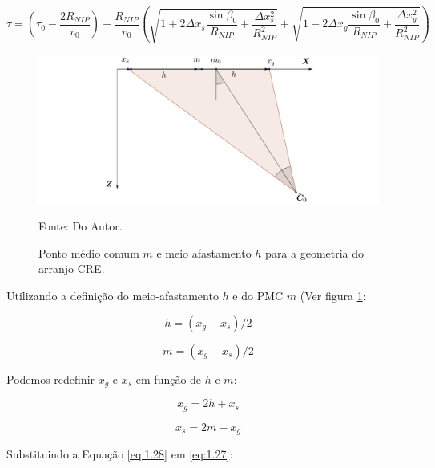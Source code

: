 \documentclass[a4paper, 12pt]{article}
\begin{document}
\begin{equation}
 \label{eq:1.24}
\tau = \left( \tau_0 - \frac{2 R_{NIP}}{v_0} \right)
+ \frac{R_{NIP}}{v_0} \left( \sqrt{  1 + 2 \Delta x_s \frac{\sin{\beta_0}}{R_{NIP}} + \frac{\Delta x_{s}^2}{R_{NIP}^2} }
+ \sqrt{  1 - 2 \Delta x_g \frac{\sin{\beta_0}}{R_{NIP}} + \frac{\Delta x_{g}^2}{R_{NIP}^2} } \right)
\end{equation}

\begin{figure}[H]
\caption{Ponto médio comum $m$ e meio afastamento $h$ para a geometria do arranjo CRE.}
\begin{center}
\includegraphics[scale=0.5]{images/creCMP.png}
\vspace{-0.3cm}
\end{center}
\begin{center}
 Fonte: Do Autor.
\end{center}
\label{fig:1.6}
\end{figure}

Utilizando a definição do meio-afastamento $h$ e do PMC $m$ (Ver figura \ref{fig:1.6}:

\begin{equation}
 \label{eq:1.25}
 h=(x_g-x_s)/2
\end{equation}

\begin{equation}
 \label{eq:1.26}
 m=(x_g + x_s)/2
\end{equation}

Podemos redefinir $x_g$ e $x_s$ em função de $h$ e $m$:

\begin{equation}
 \label{eq:1.27}
 x_g = 2h + x_s
\end{equation}

\begin{equation}
 \label{eq:1.28}
 x_s = 2m - x_g
\end{equation}

Substituindo a Equação \ref{eq:1.28} em \ref{eq:1.27}:
\end{document}
